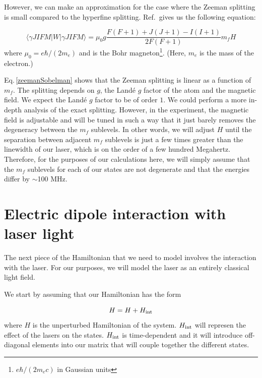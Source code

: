 However, we can make an approximation for the case where the Zeeman splitting is small compared to the hyperfine splitting. 
Ref.\,\cite{sobelman_spectra} gives us the following equation:

\begin{equation} \label{zeemanSobelman}
\langle{\gamma JIFM|W|\gamma JIFM\rangle = \mu_0 g \frac{F(F+1)+J(J+1)-I(I+1)}{2F(F+1)}m_f H}
\end{equation}
where $\mu_0=e\hbar/(2 m_e)$ and is the Bohr magneton\footnote{$e \hbar / (2 m_e c)$ in Gaussian units}. (Here, $m_e$ is the mass of the electron.)

Eq.\,\ref{zeemanSobelman} shows that the Zeeman splitting is linear as a function of $m_f$. The splitting depends on $g$, the Land\'e $g$ factor of the atom and the magnetic field. We expect the Land\'e $g$ factor to be of order $1$. We could perform a more in-depth analysis of the exact splitting. However, in the experiment, the magnetic field is adjustable and will be tuned in such a way that it just barely removes the degeneracy between the $m_f$ sublevels. In other words, we will adjust $H$ until the separation between adjacent $m_f$ sublevels is just a few times greater than the linewidth of our laser, which is on the order of a few hundred Megahertz. Therefore, for the purposes of our calculations here, we will simply assume that the $m_f$ sublevels for each of our states are not degenerate and that the energies differ by $\sim$100 MHz.

\section{Electric dipole interaction with laser light}
\label{ElectricDipoleInteraction}

The next piece of the Hamiltonian that we need to model involves the interaction with the laser. For our purposes, we will model the laser as an entirely classical light field.  

We start by assuming that our Hamiltonian has the form 

\begin{equation}
H=H+H_{\textnormal{int}}
\end{equation}
where $H$ is the unperturbed Hamiltonian of the system. $H_{\textnormal{int}}$ will represen the effect of the lasers on the states. $H_\textnormal{int}$ is time-dependent and it will introduce off-diagonal elements into our matrix that will couple together the different states. 

